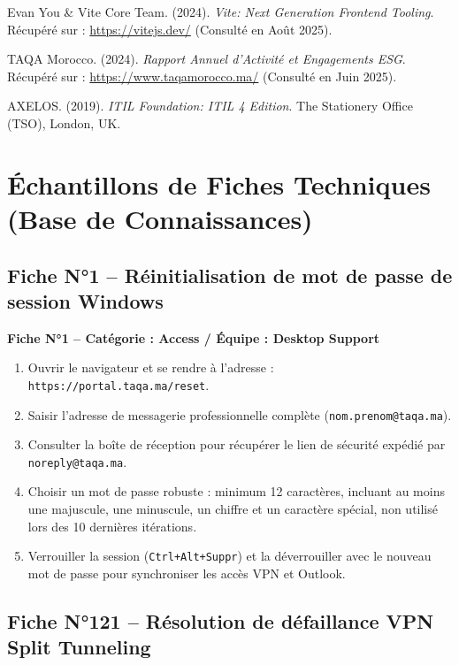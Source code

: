 \documentclass[12pt, a4paper, oneside]{report}
\begin{document}
\noindent [6] Evan You \& Vite Core Team. (2024). \textit{Vite: Next Generation Frontend Tooling}. Récupéré sur : \url{https://vitejs.dev/} (Consulté en Août 2025).

\noindent [7] TAQA Morocco. (2024). \textit{Rapport Annuel d'Activité et Engagements ESG}. Récupéré sur : \url{https://www.taqamorocco.ma/} (Consulté en Juin 2025).

\noindent [8] AXELOS. (2019). \textit{ITIL Foundation: ITIL 4 Edition}. The Stationery Office (TSO), London, UK.

\newpage
\appendix

\chapter{Échantillons de Fiches Techniques (Base de Connaissances)}

\section*{Fiche N°1 -- Réinitialisation de mot de passe de session Windows}

\begin{remarque}
\textbf{Fiche N°1 -- Catégorie : Access / Équipe : Desktop Support}

\begin{enumerate}
  \item Ouvrir le navigateur et se rendre à l'adresse : \texttt{https://portal.taqa.ma/reset}.
  \item Saisir l'adresse de messagerie professionnelle complète (\texttt{nom.prenom@taqa.ma}).
  \item Consulter la boîte de réception pour récupérer le lien de sécurité expédié par \texttt{noreply@taqa.ma}.
  \item Choisir un mot de passe robuste : minimum 12 caractères, incluant au moins une majuscule, une minuscule, un chiffre et un caractère spécial, non utilisé lors des 10 dernières itérations.
  \item Verrouiller la session (\texttt{Ctrl+Alt+Suppr}) et la déverrouiller avec le nouveau mot de passe pour synchroniser les accès VPN et Outlook.
\end{enumerate}
\end{remarque}

\section*{Fiche N°121 -- Résolution de défaillance VPN Split Tunneling}
\end{document}
